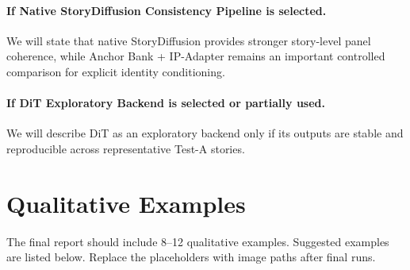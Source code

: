 \documentclass[11pt,a4paper]{article}
\newcommand{\pipelineB}{Native StoryDiffusion Consistency Pipeline}
\newcommand{\pipelineC}{DiT Exploratory Backend}
\begin{document}
\paragraph{If \pipelineB{} is selected.}
We will state that native StoryDiffusion provides stronger story-level panel coherence, while Anchor Bank + IP-Adapter remains an important controlled comparison for explicit identity conditioning.

\paragraph{If \pipelineC{} is selected or partially used.}
We will describe DiT as an exploratory backend only if its outputs are stable and reproducible across representative Test-A stories.

\section{Qualitative Examples}
\label{sec:qualitative_examples}

The final report should include 8--12 qualitative examples. Suggested examples are listed below. Replace the placeholders with image paths after final runs.
\end{document}
